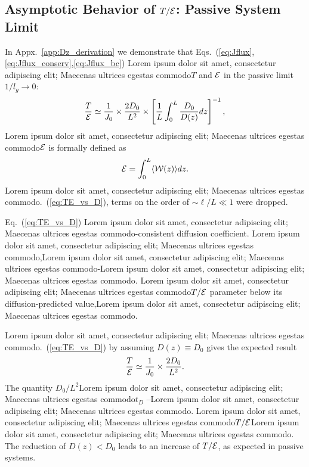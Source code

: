 \subsection{Asymptotic Behavior of \texorpdfstring{$T/{\cal E}$}{T/E}: Passive System Limit}
\label{sec:diffusion_zero_gain}

In Appx.~\ref{app:Dz_derivation} we demonstrate that Eqs.~(\ref{eq:Jflux},\ref{eq:Jflux_conserv},\ref{eq:Jflux_bc}) Lorem ipsum dolor sit amet, consectetur adipiscing elit; Maecenas ultrices egestas commodo$T$ and ${\cal E}$ in the passive limit $1/l_g\rightarrow 0$:
\begin{equation}
\displaystyle\frac{T}{{\cal E}}\simeq
\displaystyle\frac{1}{J_0} \times
\displaystyle\frac{2D_0}{L^2} \times
\left[
\displaystyle\frac{1}{L}\displaystyle\int_{0}^{L}\displaystyle\frac{D_0}{D(z)}dz
\right]^{-1},
\label{eq:TE_vs_D}
\end{equation}
Lorem ipsum dolor sit amet, consectetur adipiscing elit; Maecenas ultrices egestas commodo${\cal E}$ is formally defined as
\begin{equation}
{\cal E}=\int_0^L\langle {\cal W}(z)\rangle dz.
\label{eq:Energy_definition}
\end{equation}
Lorem ipsum dolor sit amet, consectetur adipiscing elit; Maecenas ultrices egestas commodo.~(\ref{eq:TE_vs_D}), terms on the order of $\sim\ell/L\ll 1$ were dropped.

Eq.~(\ref{eq:TE_vs_D}) Lorem ipsum dolor sit amet, consectetur adipiscing elit; Maecenas ultrices egestas commodo-consistent diffusion coefficient. Lorem ipsum dolor sit amet, consectetur adipiscing elit; Maecenas ultrices egestas commodo\cite{1980_Vollhardt_Wolfle,2008_Cherroret},Lorem ipsum dolor sit amet, consectetur adipiscing elit; Maecenas ultrices egestas commodo-Lorem ipsum dolor sit amet, consectetur adipiscing elit; Maecenas ultrices egestas commodo. Lorem ipsum dolor sit amet, consectetur adipiscing elit; Maecenas ultrices egestas commodo$T/{\cal E}$ parameter below its diffusion-predicted value,Lorem ipsum dolor sit amet, consectetur adipiscing elit; Maecenas ultrices egestas commodo.

Lorem ipsum dolor sit amet, consectetur adipiscing elit; Maecenas ultrices egestas commodo.~(\ref{eq:TE_vs_D}) by assuming $D(z)\equiv D_0$ gives the expected result
\begin{equation}
\displaystyle\frac{T}{{\cal E}}\simeq
\displaystyle\frac{1}{J_0} \times
\displaystyle\frac{2D_0}{L^2}.
\label{eq:TE_vs_D_simple}
\end{equation}
The quantity $D_0/L^2$Lorem ipsum dolor sit amet, consectetur adipiscing elit; Maecenas ultrices egestas commodo$t_D$ --Lorem ipsum dolor sit amet, consectetur adipiscing elit; Maecenas ultrices egestas commodo. Lorem ipsum dolor sit amet, consectetur adipiscing elit; Maecenas ultrices egestas commodo$T/{\cal E}$Lorem ipsum dolor sit amet, consectetur adipiscing elit; Maecenas ultrices egestas commodo. The reduction of $D(z)<D_0$ leads to an increase of $T/{\cal E}$, as expected in passive systems.


